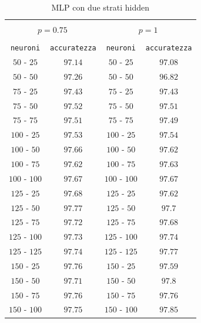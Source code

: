 \documentclass[11pt,a4paper,twoside,
openright]{book}
\begin{document}
\vspace*{\fill}
\begin{center}

\begin{table}[]
  \small
  \caption{MLP con due strati hidden}\label{tab:tab1}
\begin{center}
\begin{tabular}{@{}cc|cc@{}}

\hline\\[-11pt]
\hline\\[-6.5pt]
\multicolumn{2}{c}{\bf $p=0.75$} & \multicolumn{2}{c}{\bf $p=1$ } \\[5pt]
\hline\\[-11pt]
\texttt{neuroni} & \texttt{accuratezza} & \texttt{neuroni} & \texttt{accuratezza} \\[1pt]
$50$ - $25$ & $97.14$ & $50$ - $25$ & $97.08$ \\ [1pt]
$50$ - $50$ & $97.26$ & $50$ - $50$ & $96.82$ \\ [1pt]
$75$ - $25$ & $97.43$ & $75$ - $25$ & $97.43$ \\ [1pt]
$75$ - $50$ & $97.52$ & $75$ - $50$ & $97.51$ \\ [1pt]
$75$ - $75$ & $97.51$ & $75$ - $75$ & $97.49$ \\ [1pt]
$100$ - $25$ & $97.53$  &  $100$ - $25$ & $97.54$ \\ [1pt]
$100$ - $50$ & $97.66$  &  $100$ - $50$ & $97.62$ \\ [1pt]
$100$ - $75$ & $97.62$  &  $100$ - $75$ & $97.63$ \\ [1pt]
$100$ - $100$ & $97.67$  & $100$ - $100$ & $97.67$ \\ [1pt]
$125$ - $25$ & $97.68$  &  $125$ - $25$ & $97.62$ \\ [1pt]
$125$ - $50$ & $97.77$ &  $125$ - $50$ & $97.7$ \\ [1pt]
$125$ - $75$ & $97.72$  &  $125$ - $75$ & $97.68$ \\ [1pt]
$125$ - $100$ & $97.73$  & $125$ - $100$ & $97.74$ \\ [1pt]
$125$ - $125$ & $97.74$  & $125$ - $125$ & $97.77$ \\ [1pt]
$150$ - $25$ & $97.76$  &  $150$ - $25$ & $97.59$ \\ [1pt]
$150$ - $50$ & $97.71$ &  $150$ - $50$ & $97.8$ \\ [1pt]
$150$ - $75$ & $97.76$  &  $150$ - $75$ & $97.76$ \\ [1pt]
$150$ - $100$ & $97.75$  & $150$ - $100$ & $97.85$ \\ [1pt]

\end{tabular}
\end{center}
\end{table}
\end{center}
\end{document}
